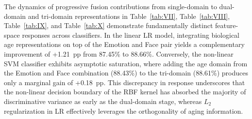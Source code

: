 The dynamics of progressive fusion contributions from single-domain to dual-domain and tri-domain representations in Table~\ref{tab:VII}, Table~\ref{tab:VIII}, Table~\ref{tab:IX}, and Table~\ref{tab:X} demonstrate fundamentally distinct feature-space responses across classifiers. In the linear LR model, integrating biological age representations on top of the Emotion and Face pair yields a complementary improvement of +1.21~pp from 87.45\% to 88.66\%. Conversely, the non-linear SVM classifier exhibits asymptotic saturation, where adding the age domain from the Emotion and Face combination (88.43\%) to the tri-domain (88.61\%) produces only a marginal gain of +0.18~pp. This discrepancy in response underscores that the non-linear decision boundary of the RBF kernel has absorbed the majority of discriminative variance as early as the dual-domain stage, whereas $L_2$ regularization in LR effectively leverages the orthogonality of aging information.
